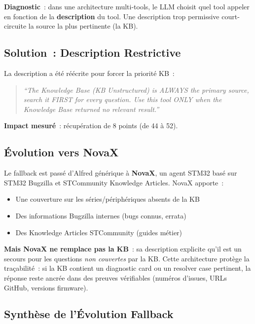 \textbf{Diagnostic}~: dans une architecture multi-tools, le LLM choisit quel tool appeler en fonction de la \textbf{description} du tool. Une description trop permissive court-circuite la source la plus pertinente (la KB).

\subsection{Solution~: Description Restrictive}

La description a été réécrite pour forcer la priorité KB~:

\begin{quote}
\small\textit{``The Knowledge Base (KB Unstructured) is ALWAYS the primary source, search it FIRST for every question. Use this tool ONLY when the Knowledge Base returned no relevant result.''}
\end{quote}

\textbf{Impact mesuré}~: récupération de 8 points (de 44 à 52).

\subsection{Évolution vers NovaX}

Le fallback est passé d'Alfred générique à \textbf{NovaX}, un agent STM32 basé sur STM32 Bugzilla et STCommunity Knowledge Articles. NovaX apporte~:
\begin{itemize}
  \item Une couverture sur les séries/périphériques absents de la KB
  \item Des informations Bugzilla internes (bugs connus, errata)
  \item Des Knowledge Articles STCommunity (guides métier)
\end{itemize}

\textbf{Mais NovaX ne remplace pas la KB}~: sa description explicite qu'il est un secours pour les questions \textit{non couvertes} par la KB. Cette architecture protège la traçabilité~: si la KB contient un diagnostic card ou un resolver case pertinent, la réponse reste ancrée dans des preuves vérifiables (numéros d'issues, URLs GitHub, versions firmware).

\subsection{Synthèse de l'Évolution Fallback}

